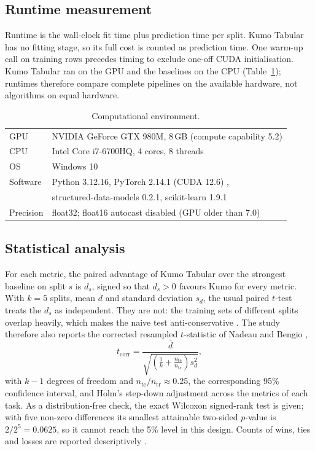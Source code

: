 \documentclass{ieeeaccess}
\begin{document}
\subsection{Runtime measurement}
Runtime is the wall-clock fit time plus prediction time per split. Kumo Tabular has no fitting stage, so its full cost is counted as prediction time. One warm-up call on training rows precedes timing to exclude one-off CUDA initialisation. Kumo Tabular ran on the GPU and the baselines on the CPU (Table~\ref{tab:environment}); runtimes therefore compare complete pipelines on the available hardware, not algorithms on equal hardware.

\begin{table}[t]
\centering
\caption{Computational environment.}
\label{tab:environment}
\setlength{\tabcolsep}{3pt}
\begin{tabular}{ll}
\toprule
GPU & NVIDIA GeForce GTX 980M, 8\,GB (compute capability 5.2) \\
CPU & Intel Core i7-6700HQ, 4 cores, 8 threads \\
OS & Windows 10 \\
Software & Python 3.12.16, PyTorch 2.14.1 (CUDA 12.6) \cite{paszke2019pytorch}, \\
& structured-data-models 0.2.1, scikit-learn 1.9.1 \\
Precision & float32; float16 autocast disabled (GPU older than 7.0) \\
\bottomrule
\end{tabular}
\end{table}

\subsection{Statistical analysis}
\label{sec:stats}
For each metric, the paired advantage of Kumo Tabular over the strongest baseline on split $s$ is $d_s$, signed so that $d_s>0$ favours Kumo for every metric. With $k=5$ splits, mean $\overline{d}$ and standard deviation $s_d$, the usual paired $t$-test treats the $d_s$ as independent. They are not: the training sets of different splits overlap heavily, which makes the naive test anti-conservative \cite{dietterich1998tests}. The study therefore also reports the corrected resampled $t$-statistic of Nadeau and Bengio \cite{nadeau2003inference},
\begin{equation}
t_{\mathrm{corr}}=\frac{\overline{d}}{\sqrt{\left(\frac{1}{k}+\frac{n_{\mathrm{te}}}{n_{\mathrm{tr}}}\right)s_d^{2}}},
\label{eq:corrected}
\end{equation}
with $k-1$ degrees of freedom and $n_{\mathrm{te}}/n_{\mathrm{tr}}\approx0.25$, the corresponding 95\% confidence interval, and Holm's step-down adjustment \cite{holm1979} across the metrics of each task. As a distribution-free check, the exact Wilcoxon signed-rank test \cite{wilcoxon1945} is given; with five non-zero differences its smallest attainable two-sided $p$-value is $2/2^5=0.0625$, so it cannot reach the 5\% level in this design. Counts of wins, ties and losses are reported descriptively \cite{demsar2006comparisons}.
\end{document}
